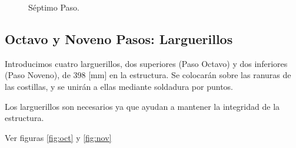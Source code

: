 \begin{figure}[!htb]
\centering
{}
\caption{Séptimo Paso. \label{fig:sept}}
\end{figure}


\subsection{Octavo y Noveno Pasos: Larguerillos}
Introducimos cuatro larguerillos, dos superiores (Paso Octavo) y dos inferiores (Paso Noveno), de 398 [mm] en la estructura. Se colocarán sobre las ranuras de las costillas, y se unirán a ellas mediante soldadura por puntos.

Los larguerillos son necesarios ya que ayudan a mantener la integridad de la estructura.

Ver figuras \ref{fig:oct} y \ref{fig:nov}

